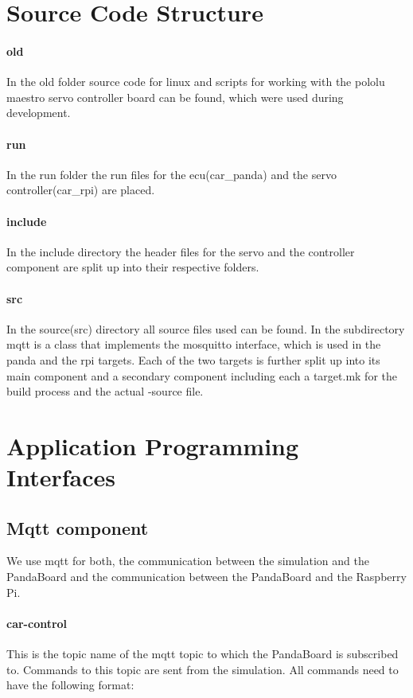 \section{Source Code Structure}
\paragraph{old}
In the old folder source code for linux and scripts for working with the pololu maestro servo controller board can be found, which were used during development.

\paragraph{run}
In the run folder the run files for the ecu(car\_panda) and the servo controller(car\_rpi) are placed.

\paragraph{include}
In the include directory the header files for the servo and the controller component are split up into their respective folders.

\paragraph{src}
In the source(src) directory all source files used can be found. In the subdirectory mqtt is a class that implements the mosquitto interface, which is used in the panda and the rpi targets. Each of the two targets is further split up into its main component and a secondary component including each a target.mk for the build process and the actual \CC-source file.

\section{Application Programming Interfaces}
\subsection{Mqtt component}
We use mqtt for both, the communication between the simulation and the PandaBoard and the communication between the PandaBoard and the Raspberry Pi.

\paragraph{car-control}
This is the topic name of the mqtt topic to which the PandaBoard is subscribed to. Commands to this topic are sent from the simulation. All commands need to have the following format: \\

